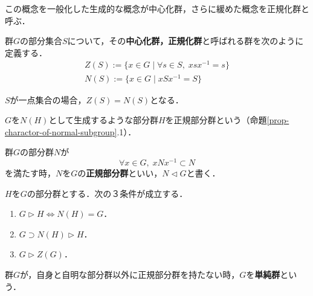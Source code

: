 \documentclass[uplatex,dvipdfmx]{jsreport}
\begin{document}
この概念を一般化した生成的な概念が中心化群，さらに緩めた概念を正規化群と呼ぶ．

\begin{definition}
    群$G$の部分集合$S$について，その\textbf{中心化群，正規化群}と呼ばれる群を次のように定義する．
    \begin{align*}
        Z(S) := \{ x\in G\mid \forall s\in S,\; xsx^{-1}=s \}\\
        N(S) := \{ x\in G\mid xSx^{-1}=S \}
    \end{align*}
\end{definition}
\begin{remark}
    $S$が一点集合の場合，$Z(S)=N(S)$となる．
\end{remark}

$G$を$N(H)$として生成するような部分群$H$を正規部分群という（命題\ref{prop-charactor-of-normal-subgroup}.1）．

\begin{definition}
    群$G$の部分群$N$が
    \[ \forall x\in G,\; xNx^{-1}\subset N \]
    を満たす時，$N$を$G$の\textbf{正規部分群}といい，$N\triangleleft G$と書く．
\end{definition}

\begin{proposition}[正規部分群の性質]\label{prop-charactor-of-normal-subgroup}
    $H$を$G$の部分群とする．次の３条件が成立する．
    \begin{enumerate}
        \item $G\triangleright H\Leftrightarrow N(H)=G$．
        \item $G\supset N(H)\triangleright H$．
        \item $G\triangleright Z(G)$．
    \end{enumerate}
\end{proposition}

\begin{definition}
    群$G$が，自身と自明な部分群以外に正規部分群を持たない時，$G$を\textbf{単純群}という．
\end{definition}
\end{document}
